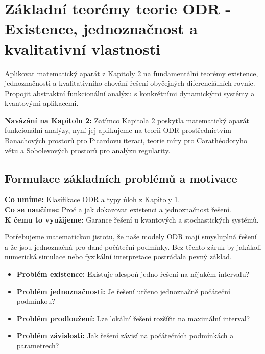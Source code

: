 \section{Základní teorémy teorie ODR - Existence, jednoznačnost a kvalitativní vlastnosti}
\label{sec:zakladni-teoremy}

Aplikovat matematický aparát z Kapitoly 2 na fundamentální teorémy existence, jednoznačnosti a kvalitativního chování řešení obyčejných diferenciálních rovnic. Propojit abstraktní funkcionální analýzu s konkrétními dynamickými systémy a kvantovými aplikacemi.

\begin{intermezzo}
\textbf{Navázání na Kapitolu 2:} Zatímco Kapitola 2 poskytla matematický aparát funkcionální analýzy, nyní jej aplikujeme na teorii ODR prostřednictvím \hyperref[sec:matematicky-fundament]{Banachových prostorů pro Picardovu iteraci}, \hyperref[sec:matematicky-fundament]{teorie míry pro Carathéodoryho větu} a \hyperref[sec:matematicky-fundament]{Sobolevových prostorů pro analýzu regularity}.
\end{intermezzo}

\spc

\subsection{Formulace základních problémů a motivace}

\begin{scaffold}
\textbf{Co umíme:} Klasifikace ODR a typy úloh z Kapitoly 1. \\
\textbf{Co se naučíme:} Proč a jak dokazovat existenci a jednoznačnost řešení. \\
\textbf{K čemu to využijeme:} Garance řešení u kvantových a stochastických systémů.
\end{scaffold}

\begin{motivation}
Potřebujeme matematickou jistotu, že naše modely ODR mají smysluplná řešení a že jsou jednoznačná pro dané počáteční podmínky. Bez těchto záruk by jakákoli numerická simulace nebo fyzikální interpretace postrádala pevný základ.
\end{motivation}

\begin{itemize}
\item \textbf{Problém existence:} Existuje alespoň jedno řešení na nějakém intervalu?
\item \textbf{Problém jednoznačnosti:} Je řešení určeno jednoznačně počáteční podmínkou?
\item \textbf{Problém prodloužení:} Lze lokální řešení rozšířit na maximální interval?
\item \textbf{Problém závislosti:} Jak řešení závisí na počátečních podmínkách a parametrech?
\end{itemize}

